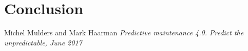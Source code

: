 \documentclass[11pt, oneside]{article}   	%
\begin{document}
\section{Conclusion}










\begin{thebibliography}{9}

% 
%


 
Michel Mulders and Mark Haarman
\textit{Predictive maintenance 4.0. Predict the unpredictable, June 2017}

 

\end{thebibliography}
\end{document}
